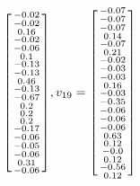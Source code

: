 \documentclass[a4paper,hidelinks,14pt]{extarticle}
\begin{document}
$$\begin{bsmallmatrix}
		-0.02\\  
		-0.02\\  
		0.16\\      
		-0.02\\  
		-0.06\\     
		0.1\\        
		-0.13\\ 
		-0.13\\     
		0.46\\      
		-0.13\\   
		-0.67\\     
		0.2\\     
		0.2\\      
		0.2\\      
		-0.17\\   
		-0.06\\   
		-0.05\\      
		-0.06\\
		0.31\\     
		-0.06\\  
	\end{bsmallmatrix},
	v_{19}=\begin{bsmallmatrix}
		         -0.07\\
		-0.07\\ 
		-0.07\\ 
		0.14\\      
		-0.07\\ 
		0.21\\     
		-0.02\\       
		-0.03\\
		-0.03\\    
		0.16\\      
		-0.03\\  
		-0.35\\    
		-0.06\\    
		-0.06\\     
		-0.06\\     
		0.63\\   
		0.12\\   
		-0.0\\      
		0.12\\
		-0.56\\    
		0.12\\  
	\end{bsmallmatrix}
	$$
\end{document}
